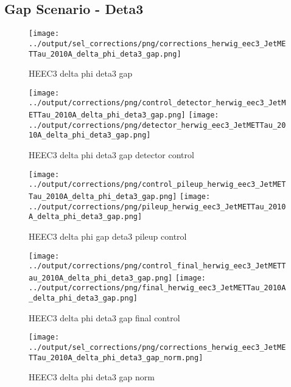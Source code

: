 \documentclass[11pt]{book}
\begin{document}
\clearpage
\subsection{Gap Scenario - Deta3}

\begin{figure}[ht]
\centering
\texttt{[image: ../output/sel\_corrections/png/corrections\_herwig\_eec3\_JetMETTau\_2010A\_delta\_phi\_deta3\_gap.png]}
\caption{HEEC3 delta phi deta3 gap}
\label{fig:HEEC3_JetMETTau_2010A_delta_phi_deta3_gap}
\end{figure}

\begin{figure}[ht]
\centering
\texttt{[image: ../output/corrections/png/control\_detector\_herwig\_eec3\_JetMETTau\_2010A\_delta\_phi\_deta3\_gap.png]}
\texttt{[image: ../output/corrections/png/detector\_herwig\_eec3\_JetMETTau\_2010A\_delta\_phi\_deta3\_gap.png]}
\caption{HEEC3 delta phi deta3 gap detector control}
\label{fig:HEEC3_JetMETTau_2010A_delta_phi_deta3_gap_detector_control}
\end{figure}

\begin{figure}[ht]
\centering
\texttt{[image: ../output/corrections/png/control\_pileup\_herwig\_eec3\_JetMETTau\_2010A\_delta\_phi\_deta3\_gap.png]}
\texttt{[image: ../output/corrections/png/pileup\_herwig\_eec3\_JetMETTau\_2010A\_delta\_phi\_deta3\_gap.png]}
\caption{HEEC3 delta phi gap deta3 pileup control}
\label{fig:HEEC3_JetMETTau_2010A_delta_phi_deta3_gap_pileup_control}
\end{figure}


\begin{figure}[ht]
\centering
\texttt{[image: ../output/corrections/png/control\_final\_herwig\_eec3\_JetMETTau\_2010A\_delta\_phi\_deta3\_gap.png]}
\texttt{[image: ../output/corrections/png/final\_herwig\_eec3\_JetMETTau\_2010A\_delta\_phi\_deta3\_gap.png]}
\caption{HEEC3 delta phi deta3 gap final control}
\label{fig:HEEC3_JetMETTau_2010A_delta_phi_deta3_gap_final_control}
\end{figure}


\begin{figure}[ht]
\centering
\texttt{[image: ../output/sel\_corrections/png/corrections\_herwig\_eec3\_JetMETTau\_2010A\_delta\_phi\_deta3\_gap\_norm.png]}
\caption{HEEC3 delta phi deta3 gap norm}
\label{fig:HEEC3_JetMETTau_2010A_delta_phi_deta3_gap_norm}
\end{figure}
\end{document}
